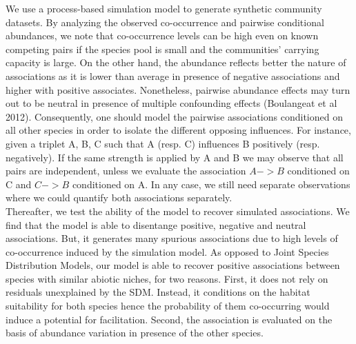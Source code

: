\documentclass[]{article}
\begin{document}
\noindent We use a process-based simulation model to generate synthetic community datasets. By analyzing the observed co-occurrence and pairwise conditional abundances, we note that co-occurrence levels can be high even on known competing pairs if the species pool is small and the communities' carrying capacity is large. On the other hand, the abundance reflects better the nature of associations as it is lower than average in presence of negative associations and higher with positive associates. Nonetheless, pairwise abundance effects may turn out to be neutral in presence of multiple confounding effects (Boulangeat et al 2012). Consequently, one should model the pairwise associations conditioned on all other species in order to isolate the different opposing influences. For instance, given a triplet A, B, C such that A (resp. C) influences B positively (resp. negatively). If the same strength is applied by A and B we may observe that all pairs are independent, unless we evaluate the association $ A -> B $ conditioned on C and $C -> B$ conditioned on A. In any case, we still need separate observations where we could quantify both associations separately. \\

\noindent Thereafter, we test the ability of the model to recover simulated associations. We find that the model is able to disentange positive, negative and neutral associations. But, it generates many spurious associations due to high levels of co-occurrence induced by the simulation model. As opposed to Joint Species Distribution Models, our model is able to recover positive associations between species with similar abiotic niches, for two reasons. First, it does not rely on residuals unexplained by the SDM. Instead, it conditions on the habitat suitability for both species hence the probability of them co-occurring would induce a potential for facilitation. Second, the association is evaluated on the basis of abundance variation in presence of the other species. \\ 
\end{document}

